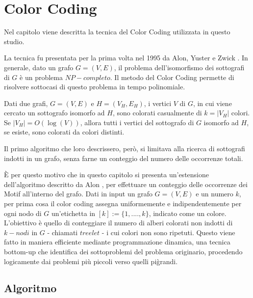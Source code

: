 \chapter{Color Coding}

Nel capitolo viene descritta la tecnica del Color Coding utilizzata in questo studio.

La tecnica fu presentata per la prima volta nel 1995 da Alon, Yuster e Zwick \cite{alon1995color}.
In generale, dato un grafo $G = (V,E)$, il problema dell'isomorfismo dei sottografi  di $G$ \`e un problema $NP-completo$.
Il metodo del Color Coding permette di risolvere sottocasi di questo problema in tempo polinomiale.

Dati due grafi, $ G = (V,E) $ e $H = (V_H, E_H)$, i vertici $V$ di $G$, in cui viene cercato un  sottografo isomorfo ad $H$, sono colorati casualmente di $k = |V_H|$ colori. Se $|V_H| = O(\log(V))$, allora tutti i vertici del sottografo di $G$ isomorfo ad $H$, se esiste, sono colorati da colori distinti.   

Il primo algoritmo che loro descrissero, per\`o, si limitava alla ricerca di sottografi indotti in un grafo, senza farne un conteggio del numero delle occorrenze totali.
 
\`E per questo motivo che in questo capitolo si presenta un'estensione dell'algoritmo descritto da Alon \cite{alon1995color}, per effettuare un conteggio delle occorrenze dei Motif all'interno del grafo.
Dati in input un grafo $ G=(V,E) $ e un numero $ k $, per prima cosa il color coding assegna uniformemente e indipendentemente per ogni nodo di $ G $ un'etichetta in $ [k] := \{1,....,k\} $, indicato come un colore.
L'obiettivo \`e quello di conteggiare il numero di alberi colorati non indotti di $ k-nodi $ in $ G $ - chiamati $ treelet $ - i cui colori non sono ripetuti.
Questo viene fatto in maniera efficiente mediante  programmazione dinamica, una tecnica bottom-up che identifica dei sottoproblemi del problema originario, procedendo logicamente dai problemi pi\`u piccoli verso quelli pi\` grandi.




\section{Algoritmo}
\label{section1}

